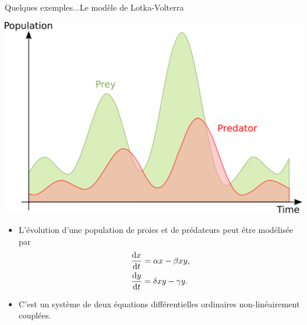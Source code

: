 \documentclass[usenames,dvipsnames,svgnames,10pt,aspectratio=169]{beamer}
\begin{document}
\begin{frame}[t, c]{Quelques exemples...}{Le modèle de Lotka-Volterra}
	\begin{minipage}{.48\textwidth}
		\centering
		\includegraphics[width=.9\textwidth]{Lotka_Volterra}
	\end{minipage}%
	\hfill
	\begin{minipage}{.48\textwidth}
		\begin{itemize}
			\item L'évolution d'une population de proies et de prédateurs peut être modélisée par
			\begin{equation}
				\begin{aligned}
					\displaystyle \frac{\mathrm{d} x}{\mathrm{d}t} & = \alpha x - \beta xy,\\
					\displaystyle \frac{\mathrm{d} y}{\mathrm{d}t} & = \delta x y - \gamma y.
				\end{aligned}
				\notag
			\end{equation}

			\item C'est un système de deux équations différentielles ordinaires non-linéairement couplées.
		\end{itemize}
	\end{minipage}
\end{frame}
\end{document}
